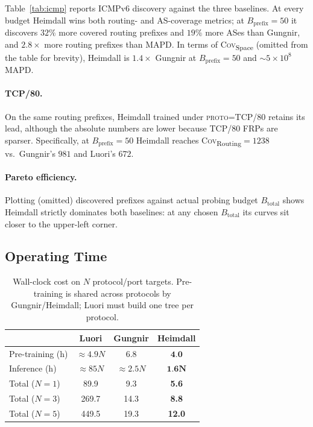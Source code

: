 \documentclass[conference]{IEEEtran}
\begin{document}
Table~\ref{tab:icmp} reports ICMPv6 discovery against the three
baselines.  At every budget Heimdall wins both routing- and AS-coverage
metrics; at $B_{\mathrm{prefix}}{=}50$ it discovers $32\%$ more
covered routing prefixes and $19\%$ more ASes than Gungnir, and
$2.8\times$ more routing prefixes than MAPD.  In terms of
\textsc{Cov}\textsubscript{Space} (omitted from the table for brevity),
Heimdall is $1.4\times$ Gungnir at $B_{\mathrm{prefix}}{=}50$ and
$\sim 5\times 10^{8}$ MAPD.

\paragraph{TCP/80.}  On the same routing prefixes, Heimdall trained
under \textsc{proto}=TCP/80 retains its lead, although the absolute
numbers are lower because TCP/80 FRPs are sparser.  Specifically, at
$B_{\mathrm{prefix}}{=}50$ Heimdall reaches
\textsc{Cov}\textsubscript{Routing}$=1238$ vs.\ Gungnir's $981$ and
Luori's $672$.

\paragraph{Pareto efficiency.}  Plotting (omitted) discovered prefixes
against actual probing budget $B_{\mathrm{total}}$ shows Heimdall
strictly dominates both baselines: at any chosen $B_{\mathrm{total}}$
its curves sit closer to the upper-left corner.

\subsection{Operating Time}\label{sec:eval-time}

\begin{table}[t]
\centering
\caption{Wall-clock cost on $N$ protocol/port targets.  Pre-training
is shared across protocols by Gungnir/Heimdall; Luori must build one
tree per protocol.}
\label{tab:time}
\footnotesize
\begin{tabular}{lccc}
\toprule
                  & Luori          & Gungnir        & \textbf{Heimdall}\\
\midrule
Pre-training (h)  & $\approx 4.9N$ & $6.8$          & $\textbf{4.0}$\\
Inference (h)     & $\approx 85N$  & $\approx 2.5N$ & $\textbf{1.6}\boldsymbol{N}$\\
\midrule
Total ($N{=}1$)   & 89.9           & 9.3            & \textbf{5.6}\\
Total ($N{=}3$)   & 269.7          & 14.3           & \textbf{8.8}\\
Total ($N{=}5$)   & 449.5          & 19.3           & \textbf{12.0}\\
\bottomrule
\end{tabular}
\end{table}
\end{document}

